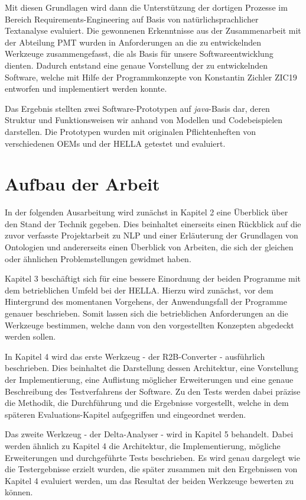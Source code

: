 \documentclass[12pt]{report}
\begin{document}
Mit diesen Grundlagen wird dann die Unterstützung der dortigen Prozesse im Bereich Requirements-Engineering auf Basis von natürlichsprachlicher Textanalyse evaluiert. Die gewonnenen Erkenntnisse aus der Zusammenarbeit mit der Abteilung PMT wurden in Anforderungen an die zu entwickelnden Werkzeuge zusammengefasst, die als Basis für unsere Softwareentwicklung dienten. Dadurch entstand eine genaue Vorstellung der zu entwickelnden Software, welche mit Hilfe der Programmkonzepte von Konstantin Zichler ZIC19 entworfen und implementiert werden konnte. 

Das Ergebnis stellten zwei Software-Prototypen auf \textit{java}-Basis dar, deren Struktur und Funktionsweisen wir anhand von Modellen und Codebeispielen darstellen. Die Prototypen wurden mit originalen Pflichtenheften von verschiedenen OEMs und der HELLA getestet und evaluiert.

\section{Aufbau der Arbeit}
In der folgenden Ausarbeitung wird zunächst in Kapitel 2 eine Überblick über den Stand der Technik gegeben. Dies beinhaltet einerseits einen Rückblick auf die zuvor verfasste Projektarbeit zu NLP und einer Erläuterung der Grundlagen von Ontologien und andererseits einen Überblick von Arbeiten, die sich der gleichen oder ähnlichen Problemstellungen gewidmet haben. 

Kapitel 3 beschäftigt sich für eine bessere Einordnung der beiden Programme mit dem betrieblichen Umfeld bei der HELLA. Hierzu wird zunächst, vor dem Hintergrund des momentanen Vorgehens, der Anwendungsfall der Programme genauer beschrieben. Somit lassen sich die betrieblichen Anforderungen an die Werkzeuge bestimmen, welche dann von den vorgestellten Konzepten abgedeckt werden sollen. 

In Kapitel 4 wird das erste Werkzeug - der R2B-Converter - ausführlich beschrieben. Dies beinhaltet die Darstellung dessen Architektur, eine Vorstellung der Implementierung, eine Auflistung möglicher Erweiterungen und eine genaue Beschreibung des Testverfahrens der Software. Zu den Tests werden dabei präzise die Methodik, die Durchführung und die Ergebnisse vorgestellt, welche in dem späteren Evaluations-Kapitel aufgegriffen und eingeordnet werden. 

Das zweite Werkzeug - der Delta-Analyser - wird in Kapitel 5 behandelt. Dabei werden ähnlich zu Kapitel 4 die Architektur, die Implementierung, mögliche Erweiterungen und durchgeführte Tests beschrieben. Es wird genau dargelegt wie die Testergebnisse erzielt wurden, die später zusammen mit den Ergebnissen von Kapitel 4 evaluiert werden, um das Resultat der beiden Werkzeuge bewerten zu können. 
\end{document}
